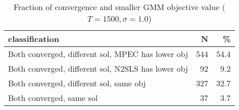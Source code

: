 \begin{table}

\caption{\label{tab:unnamed-chunk-22}Fraction of convergence and smaller GMM objective value ($T=1500,\sigma=1.0$)}
\centering
\begin{tabular}[t]{lrr}
\toprule
classification & N & \%\\
\midrule
Both converged, different sol, MPEC has lower obj & 544 & 54.4\\
Both converged, different sol, N2SLS has lower obj & 92 & 9.2\\
Both converged, different sol, same obj & 327 & 32.7\\
Both converged, same sol & 37 & 3.7\\
\bottomrule
\end{tabular}
\end{table}
